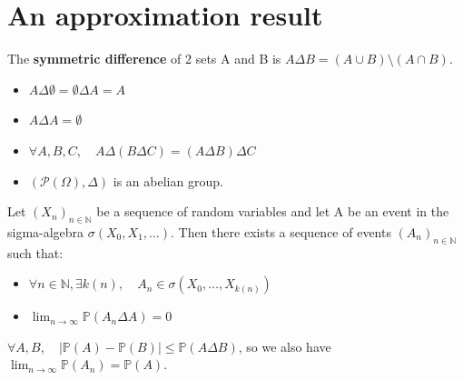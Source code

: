 \section{An approximation result}%
The \textbf{symmetric difference} of 2 sets A and B is $A \Delta B = (A \cup B) \setminus (A \cap B)$.%
\begin{itemize}
    \item $A \Delta \emptyset = \emptyset \Delta A = A$
    \item $A \Delta A = \emptyset$
    \item $\forall A, B, C, \quad A \Delta (B \Delta C) = (A \Delta B) \Delta C$
    \item $(\mathcal{P}(\Omega), \Delta)$ is an abelian group.
\end{itemize}%
\begin{proposition}
Let $(X_n)_{n \in \mathbb{N}}$ be a sequence of random variables and let A be an event in the sigma-algebra $\sigma(X_0, X_1, \dots)$.
Then there exists a sequence of events $(A_n)_{n \in \mathbb{N}}$ such that:
\begin{itemize}
    \item $\forall n \in \mathbb{N}, \exists k(n), \quad A_n \in \sigma(X_0, \dots, X_{k(n)})$
    \item $\lim_{n \to \infty} \mathbb{P}(A_n \Delta A) = 0$
\end{itemize}
\end{proposition}%
\begin{remark}
$\forall A, B, \quad |\mathbb{P}(A) - \mathbb{P}(B)| \le \mathbb{P}(A \Delta B)$, so we also have $\lim_{n \to \infty} \mathbb{P}(A_n) = \mathbb{P}(A)$.
\end{remark}%
